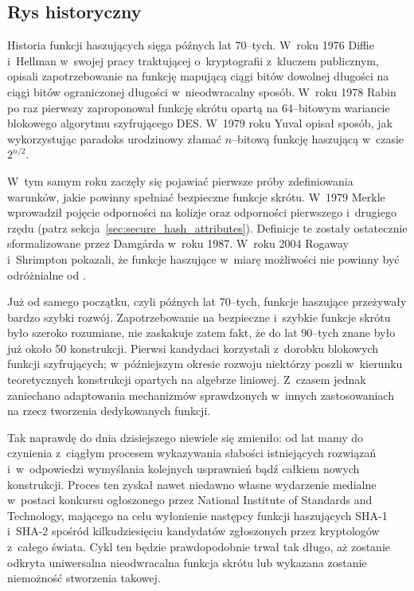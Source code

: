 \documentclass[12pt,a4paper,twoside]{article}
\begin{document}
\subsection{Rys historyczny}
Historia funkcji haszujących sięga późnych lat 70--tych. W~roku 1976 Diffie
i~Hellman w~swojej pracy traktującej o~kryptografii z~kluczem publicznym,
opisali zapotrzebowanie na funkcję mapującą ciągi bitów dowolnej długości na
ciągi bitów ograniczonej długości w~nieodwracalny sposób. W~roku 1978 Rabin po
raz pierwszy zaproponował funkcję skrótu opartą na 64--bitowym wariancie
blokowego algorytmu szyfrującego DES. W~1979 roku Yuval opisał sposób, jak
wykorzystując paradoks urodzinowy złamać $n$--bitową funkcję haszującą w~czasie
$2^{n/2}$.

W~tym samym roku zaczęły się pojawiać pierwsze próby zdefiniowania warunków,
jakie powinny spełniać bezpieczne funkcje skrótu. W~1979 Merkle wprowadził
pojęcie odporności na kolizje oraz odporności pierwszego i~drugiego rzędu
(patrz sekcja~\ref{sec:secure_hash_attributes}). Definicje te zostały
ostatecznie sformalizowane przez Damg\r{a}rda w~roku 1987. W~roku 2004 Rogaway
i~Shrimpton pokazali, że funkcje haszujące w~miarę możliwości nie powinny być
odróżnialne od .

Już od samego początku, czyli późnych lat 70--tych, funkcje haszujące
przeżywały bardzo szybki rozwój. Zapotrzebowanie na bezpieczne i~szybkie
funkcje skrótu było szeroko rozumiane, nie zaskakuje zatem fakt, że do lat
90--tych znane było już około 50 konstrukcji. Pierwsi kandydaci korzystali
z~dorobku blokowych funkcji szyfrujących; w~późniejszym okresie rozwoju
niektórzy poszli w~kierunku teoretycznych konstrukcji opartych na algebrze
liniowej. Z~czasem jednak zaniechano adaptowania mechanizmów sprawdzonych
w~innych zastosowaniach na rzecz tworzenia dedykowanych funkcji.

Tak naprawdę do dnia dzisiejszego niewiele się zmieniło: od lat mamy do
czynienia z~ciągłym procesem wykazywania słabości istniejących rozwiązań
i~w~odpowiedzi wymyślania kolejnych usprawnień bądź całkiem nowych konstrukcji.
Proces ten zyskał nawet niedawno własne wydarzenie medialne w~postaci konkursu
ogłoszonego przez National Institute of Standards and Technology, mającego na
celu wyłonienie następcy funkcji haszujących SHA-1 i~SHA-2 spośród
kilkudziesięciu kandydatów zgłoszonych przez kryptologów z~całego świata. Cykl
ten będzie prawdopodobnie trwał tak długo, aż zostanie odkryta uniwersalna
nieodwracalna funkcja skrótu lub wykazana zostanie niemożność stworzenia
takowej.
\end{document}
